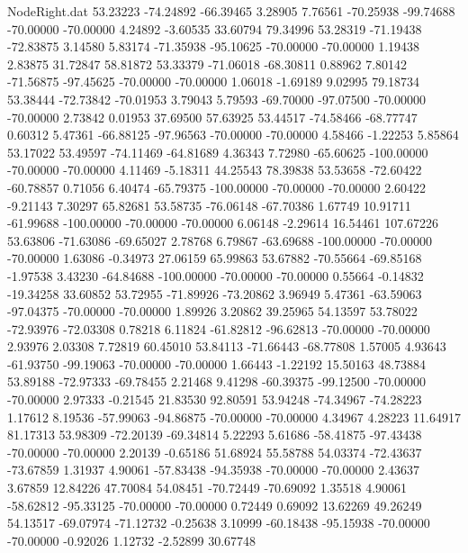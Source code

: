 \begin{filecontents}{NodeRight.dat}
  53.23223  -74.24892  -66.39465     3.28905    7.76561  -70.25938  -99.74688  -70.00000  -70.00000    4.24892   -3.60535   33.60794   79.34996
  53.28319  -71.19438  -72.83875     3.14580    5.83174  -71.35938  -95.10625  -70.00000  -70.00000    1.19438    2.83875   31.72847   58.81872
  53.33379  -71.06018  -68.30811     0.88962    7.80142  -71.56875  -97.45625  -70.00000  -70.00000    1.06018   -1.69189    9.02995   79.18734
  53.38444  -72.73842  -70.01953     3.79043    5.79593  -69.70000  -97.07500  -70.00000  -70.00000    2.73842    0.01953   37.69500   57.63925
  53.44517  -74.58466  -68.77747     0.60312    5.47361  -66.88125  -97.96563  -70.00000  -70.00000    4.58466   -1.22253    5.85864   53.17022
  53.49597  -74.11469  -64.81689     4.36343    7.72980  -65.60625 -100.00000  -70.00000  -70.00000    4.11469   -5.18311   44.25543   78.39838
  53.53658  -72.60422  -60.78857     0.71056    6.40474  -65.79375 -100.00000  -70.00000  -70.00000    2.60422   -9.21143    7.30297   65.82681
  53.58735  -76.06148  -67.70386     1.67749   10.91711  -61.99688 -100.00000  -70.00000  -70.00000    6.06148   -2.29614   16.54461  107.67226
  53.63806  -71.63086  -69.65027     2.78768    6.79867  -63.69688 -100.00000  -70.00000  -70.00000    1.63086   -0.34973   27.06159   65.99863
  53.67882  -70.55664  -69.85168    -1.97538    3.43230  -64.84688 -100.00000  -70.00000  -70.00000    0.55664   -0.14832  -19.34258   33.60852
  53.72955  -71.89926  -73.20862     3.96949    5.47361  -63.59063  -97.04375  -70.00000  -70.00000    1.89926    3.20862   39.25965   54.13597
  53.78022  -72.93976  -72.03308     0.78218    6.11824  -61.82812  -96.62813  -70.00000  -70.00000    2.93976    2.03308    7.72819   60.45010
  53.84113  -71.66443  -68.77808     1.57005    4.93643  -61.93750  -99.19063  -70.00000  -70.00000    1.66443   -1.22192   15.50163   48.73884
  53.89188  -72.97333  -69.78455     2.21468    9.41298  -60.39375  -99.12500  -70.00000  -70.00000    2.97333   -0.21545   21.83530   92.80591
  53.94248  -74.34967  -74.28223     1.17612    8.19536  -57.99063  -94.86875  -70.00000  -70.00000    4.34967    4.28223   11.64917   81.17313
  53.98309  -72.20139  -69.34814     5.22293    5.61686  -58.41875  -97.43438  -70.00000  -70.00000    2.20139   -0.65186   51.68924   55.58788
  54.03374  -72.43637  -73.67859     1.31937    4.90061  -57.83438  -94.35938  -70.00000  -70.00000    2.43637    3.67859   12.84226   47.70084
  54.08451  -70.72449  -70.69092     1.35518    4.90061  -58.62812  -95.33125  -70.00000  -70.00000    0.72449    0.69092   13.62269   49.26249
  54.13517  -69.07974  -71.12732    -0.25638    3.10999  -60.18438  -95.15938  -70.00000  -70.00000   -0.92026    1.12732   -2.52899   30.67748

\end{filecontents}
